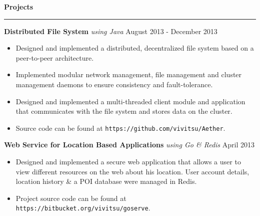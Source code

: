 \documentclass[10pt]{article}
\begin{document}
\textbf{Projects}
\smallskip
\hrule
\textbf{Distributed File System} \textit{using Java} \hfill August 2013 - December 2013
\begin{itemize}
    \item Designed and implemented a distributed, decentralized file system based on a peer-to-peer architecture.
    \item Implemented modular network management, file management and cluster management daemons to ensure consistency and fault-tolerance.
    \item Designed and implemented a multi-threaded client module and application that communicates with the file system and stores data on the cluster.
    \item Source code can be found at \texttt{https://github.com/vivitsu/Aether}.
\end{itemize}
\textbf{Web Service for Location Based Applications} \textit{using Go \& Redis} \hfill April 2013
\begin{itemize}
    \item Designed and implemented a secure web application that allows a user to view different resources on the web about his location. User account details, location history \& a POI database were managed in Redis.
    \item Project source code can be found at \texttt{https://bitbucket.org/vivitsu/goserve}.
\end{itemize}
\end{document}
